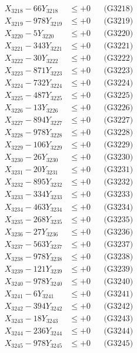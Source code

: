\documentclass[a4paper,10pt]{article}
\begin{document}
{\begin{align}
X_{3218} - 66Y_{3218} &\leq +0 && \text{(G3218)} \\
X_{3219} - 978Y_{3219} &\leq +0 && \text{(G3219)} \\
X_{3220} - 5Y_{3220} &\leq +0 && \text{(G3220)} \\
\allowbreak
X_{3221} - 343Y_{3221} &\leq +0 && \text{(G3221)} \\
X_{3222} - 30Y_{3222} &\leq +0 && \text{(G3222)} \\
X_{3223} - 871Y_{3223} &\leq +0 && \text{(G3223)} \\
X_{3224} - 732Y_{3224} &\leq +0 && \text{(G3224)} \\
X_{3225} - 487Y_{3225} &\leq +0 && \text{(G3225)} \\
X_{3226} - 13Y_{3226} &\leq +0 && \text{(G3226)} \\
X_{3227} - 894Y_{3227} &\leq +0 && \text{(G3227)} \\
X_{3228} - 978Y_{3228} &\leq +0 && \text{(G3228)} \\
X_{3229} - 106Y_{3229} &\leq +0 && \text{(G3229)} \\
X_{3230} - 26Y_{3230} &\leq +0 && \text{(G3230)} \\
\allowbreak
X_{3231} - 20Y_{3231} &\leq +0 && \text{(G3231)} \\
X_{3232} - 895Y_{3232} &\leq +0 && \text{(G3232)} \\
X_{3233} - 334Y_{3233} &\leq +0 && \text{(G3233)} \\
X_{3234} - 463Y_{3234} &\leq +0 && \text{(G3234)} \\
X_{3235} - 268Y_{3235} &\leq +0 && \text{(G3235)} \\
X_{3236} - 27Y_{3236} &\leq +0 && \text{(G3236)} \\
X_{3237} - 563Y_{3237} &\leq +0 && \text{(G3237)} \\
X_{3238} - 978Y_{3238} &\leq +0 && \text{(G3238)} \\
X_{3239} - 121Y_{3239} &\leq +0 && \text{(G3239)} \\
X_{3240} - 978Y_{3240} &\leq +0 && \text{(G3240)} \\
\allowbreak
X_{3241} - 6Y_{3241} &\leq +0 && \text{(G3241)} \\
X_{3242} - 394Y_{3242} &\leq +0 && \text{(G3242)} \\
X_{3243} - 18Y_{3243} &\leq +0 && \text{(G3243)} \\
X_{3244} - 236Y_{3244} &\leq +0 && \text{(G3244)} \\
X_{3245} - 978Y_{3245} &\leq +0 && \text{(G3245)} \\

\end{align}}
\end{document}
